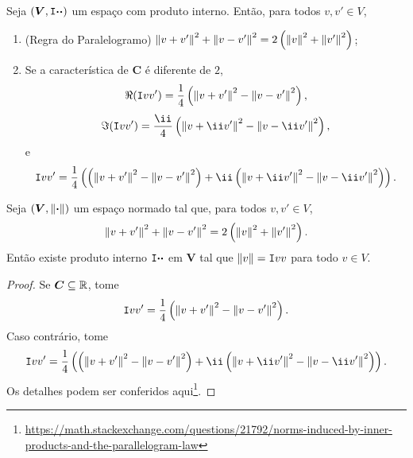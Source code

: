 \begin{prop}
Seja $(\bm V,\mathtt I{\bm{\cdot}}{\bm{\cdot}})$ um espaço com produto interno. Então, para todos $v,v' \in V$,
	\begin{enumerate}
	\item (Regra do Paralelogramo) $\left\Vert{v+v'}\right\Vert^2+\left\Vert{v-v'}\right\Vert^2 = 2\left( \left\Vert{v}\right\Vert^2 + \left\Vert{v'}\right\Vert^2 \right)$;

	\item Se a característica de $\bm C$ é diferente de $2$,
		\begin{equation*}
		\Re(\mathtt I{v}{v'}) = \frac{1}{4}\left(\left\Vert{v+v'}\right\Vert^2 - \left\Vert{v-v'}\right\Vert^2\right),
		\end{equation*}
		\begin{equation*}
		\Im(\inte{v}{v'}) = \frac{\ii}{4}\left(\nor{v+\ii v'}^2 - \nor{v-\ii v'}^2\right),
		\end{equation*}
e
		\begin{equation*}
		\inte{v}{v'} = \frac{1}{4} \left( \left(\nor{v+v'}^2 - \nor{v-v'}^2\right) + \ii \left(\nor{v+\ii v'}^2 - \nor{v-\ii v'}^2\right) \right).
		\end{equation*}
	\end{enumerate}
\end{prop}



\begin{prop}[Polarização]
Seja $(\bm V,\left\Vert{\bm{\cdot}}\right\Vert)$ um espaço normado tal que, para todos $v,v' \in V$,
	\begin{equation*}
	\left\Vert{v+v'}\right\Vert^2+\left\Vert{v-v'}\right\Vert^2 = 2\left( \left\Vert{v}\right\Vert^2 + \left\Vert{v'}\right\Vert^2 \right).
	\end{equation*}
Então existe produto interno $\mathtt I{\bm{\cdot}}{\bm{\cdot}}$ em $\bm V$ tal que $\left\Vert{v}\right\Vert=\mathtt I{v}{v}$ para todo $v \in V$.
\end{prop}
\begin{proof}
Se $\bm C \subseteq \mathbb{R}$, tome
	\begin{equation*}
	\mathtt I{v}{v'} = \frac{1}{4}\left(\left\Vert{v+v'}\right\Vert^2 - \left\Vert{v-v'}\right\Vert^2\right).
	\end{equation*}
Caso contrário, tome
	\begin{equation*}
	\inte{v}{v'} = \frac{1}{4}\left(\left(\nor{v+v'}^2 - \nor{v-v'}^2\right) + \ii \left(\nor{v+\ii v'}^2 - \nor{v-\ii v'}^2\right)\right).
	\end{equation*}
Os detalhes podem ser conferidos aqui\footnote{\href{https://math.stackexchange.com/questions/21792/norms-induced-by-inner-products-and-the-parallelogram-law}{https://math.stackexchange.com/questions/21792/norms-induced-by-inner-products-and-the-parallelogram-law}}.
\end{proof}

